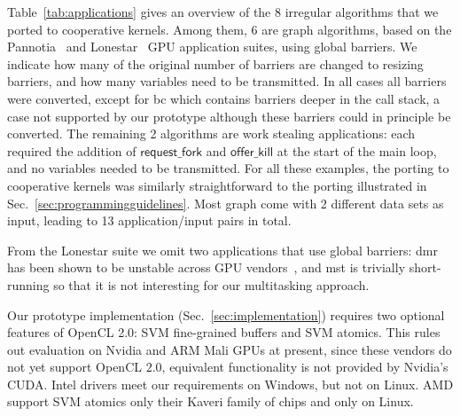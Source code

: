 \documentclass[parskip=half,sigconf,review, anonymous=true, acmcopyrightmode=none]{acmart}
\newcommand{\mytablong}{Table~}
\newcommand{\mysec}{Sec.~}
\newcommand{\nvidia}{Nvidia\xspace}
\newcommand{\offerfork}{\mathsf{request\_fork}}
\newcommand{\offerkill}{\mathsf{offer\_kill}}
\begin{document}

\mytablong\ref{tab:applications} gives an overview of the 8 irregular
algorithms that we ported to cooperative kernels. Among them, 6 are
graph algorithms, based on the Pannotia~\cite{Pannotia} and
Lonestar~\cite{BNP12} GPU application suites, using global barriers.
We indicate how many of the original number of barriers are changed to
resizing barriers, and how many variables need to be transmitted.  In
all cases all barriers were converted, except for bc which contains
barriers deeper in the call stack, a case not supported by our
prototype although these barriers could in principle be converted. The
remaining 2 algorithms are work stealing applications: each required
the addition of $\offerfork$ and $\offerkill$ at the start of the main
loop, and no variables needed to be transmitted.  For all these
examples, the porting to cooperative kernels was similarly
straightforward to the porting illustrated in
\mysec\ref{sec:programmingguidelines}. Most
graph come with 2 different data sets as input, leading to 13
application/input pairs in total.

From the Lonestar suite we omit two applications that use global
barriers: dmr has been shown to be unstable across GPU
vendors~\cite{DBLP:conf/iwocl/SorensenD16}, and mst is trivially
short-running so that it is not interesting for our multitasking
approach.

Our prototype implementation (\mysec\ref{sec:implementation}) requires
two optional features of OpenCL 2.0: SVM fine-grained buffers and SVM
atomics. This rules out evaluation on \nvidia and ARM Mali GPUs at
present, since these vendors do not yet support OpenCL $2.0$,
equivalent functionality is not provided by \nvidia's CUDA. Intel
drivers meet our requirements on Windows, but not on Linux.
AMD support SVM atomics only their Kaveri family of
chips and only on Linux.%
\end{document}
